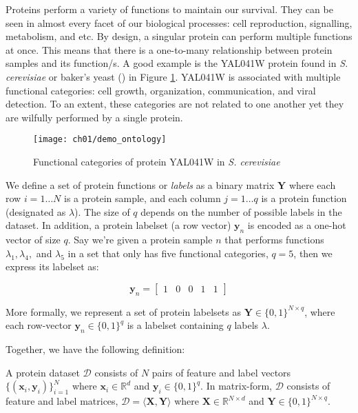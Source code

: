 \par Proteins perform a variety of functions to maintain our survival. They
can be seen in almost every facet of our biological processes: cell
reproduction, signalling, metabolism, and etc. By design, a singular protein
can perform multiple functions at once. This means that there is a
one-to-many relationship between protein samples and its function/s. A good
example is the YAL041W protein found in \textit{S. cerevisiae} or baker's
yeast (\cite{elisseeff2001kernel}) in Figure \ref{demo:yeast_go}. YAL041W is
associated with multiple functional categories: cell growth, organization,
communication, and viral detection. To an extent, these categories are not
related to one another yet they are wilfully performed by a single protein.

\begin{figure}[t]
  \centering
  \texttt{[image: ch01/demo\_ontology]}
  \caption{Functional categories of protein YAL041W in \textit{S. cerevisiae}}
  \label{demo:yeast_go}
\end{figure}

\par We define a set of protein functions or \textit{labels} as a binary
matrix $\mathbf{Y}$ where each row $i=1 \dots N$ is a protein sample, and
each column $j=1 \dots q$ is a protein function (designated as $\lambda$).
The size of $q$ depends on the number of possible labels in the dataset. In
addition, a protein labelset (a row vector) $\mathbf{y}_n$ is encoded as a
one-hot vector of size $q$. Say we're given a protein sample $n$ that performs
functions $\lambda_1, \lambda_4,$ and $\lambda_5$ in a set that only has
five functional categories, $q=5$, then we express its labelset as:

\[
    \mathbf{y}_n = \left[\begin{matrix}
        1 & 0 & 0 & 1 & 1
    \end{matrix} \right]
\]

More formally, we represent a set of protein labelsets as $\mathbf{Y} \in
\{0,1\}^{N \times q}$, where each row-vector $\mathbf{y}_n \in \{0,1\}^q$
is a labelset containing $q$ labels $\lambda$. 


\newpage
Together, we have the following definition:

\begin{definition}{}
A protein dataset $\mathcal{D}$ consists of $N$ pairs of feature and label
vectors $\{(\mathbf{x}_i, \mathbf{y}_i)\}_{i=1}^{N}$ where $\mathbf{x}_i \in
\mathbb{R}^d$ and $\mathbf{y}_i \in \{0,1\}^q$. In matrix-form, $\mathcal{D}$
consists of feature and label matrices, $\mathcal{D} = \langle \mathbf{X},
\mathbf{Y} \rangle$ where $\mathbf{X} \in \mathbb{R}^{N \times d}$ and
$\mathbf{Y} \in \{0,1\}^{N \times q}$.
\end{definition}

